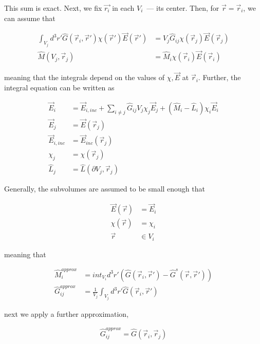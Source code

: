     This sum is exact. Next, we fix $\vec{r_i}$ in each $V_i$~--- its center. Then, for $\vec{r}=\vec{r}_i$, we can assume that

    \begin{align}
        \int_{V_j} d^3 r' \hat{G}(\vec{r}_i,\vec{r}')\chi(\vec{r}')\vec{E}(\vec{r}') &= V_j \hat{G}_{ij}\chi(\vec{r}_j)\vec{E}(\vec{r}_j) \\
        \hat{M}(V_j, \vec{r}_j) &= \hat{M}_i \chi(\vec{r}_i)\vec{E}(\vec{r}_i)
    \end{align}

    meaning that the integrals depend on the values of $\chi, \vec{E}$ at $\vec{r}_i$. Further, the integral equation can be written as

    \begin{align}
        \vec{E}_i &= \vec{E}_{i, inc} + \sum_{i\neq j}\hat{G}_{ij}V_j\chi_j\vec{E}_j + \left(\hat{M}_i -\hat{L}_i\right)\chi_i\vec{E}_i \\
        \vec{E}_j &= \vec{E}(\vec{r}_j) \\
        \vec{E}_{i, inc} &= \vec{E}_{inc}(\vec{r}_j) \\
        \chi_j &= \chi(\vec{r}_j) \\
        \hat{L}_j &= \hat{L}(\partial V_j, \vec{r}_j)
    \end{align}

    Generally, the subvolumes are assumed to be small enough that

    \begin{align}
        \vec{E}(\vec{r}) &= \vec{E}_i \\
        \chi(\vec{r}) &= \chi_i \\
        \vec{r} &\in V_i
    \end{align}

    meaning that

    \begin{align}
        \hat{M}_{i}^{approx} &= int_{V_i}d^3r'\left(\hat{G}(\vec{r}_i, \vec{r}') - \hat{G}^s(\vec{r}, \vec{r}')\right) \\
        \hat{G}_{ij}^{approx} &= \frac{1}{V_j}\int_{V_j}d^3r'\hat{G}(\vec{r}_i, \vec{r}')
    \end{align}

    next we apply a further approximation,

    \begin{align}
        \hat{G}_{ij}^{approx} = \hat{G}(\vec{r}_i, \vec{r}_j)
    \end{align}


